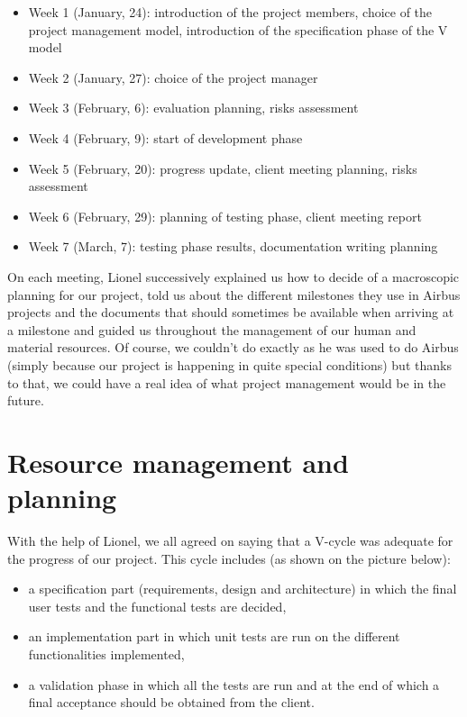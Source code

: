 \documentclass{report}
\begin{document}
\begin{itemize}


	\item Week 1 (January, 24): introduction of the project members, choice of the project management model, introduction of the specification phase of the V model
	\item Week 2 (January, 27): choice of the project manager
	\item Week 3 (February, 6): evaluation planning, risks assessment
	\item Week 4 (February, 9): start of development phase
	\item Week 5 (February, 20): progress update, client meeting planning, risks assessment
	\item Week 6 (February, 29): planning of testing phase, client meeting report
	\item Week 7 (March, 7): testing phase results, documentation writing planning

\end{itemize}

On each meeting, Lionel successively explained us how to decide of a macroscopic planning for our project, told us about the different milestones they use in Airbus projects and the documents that should sometimes be available when arriving at a milestone and guided us throughout the management of our human and material resources. Of course, we couldn't do exactly as he was used to do Airbus (simply because our project is happening in quite special conditions) but thanks to that, we could have a real idea of what project management would be in the future. 

\section{Resource management and planning}

With the help of Lionel, we all agreed on saying that a V-cycle was adequate for the progress of our project. This cycle includes (as shown on the picture below):

\begin{itemize}
	\item a specification part (requirements, design and architecture) in which the final user tests and the functional tests are decided,
	\item an implementation part in which unit tests are run on the different functionalities implemented,
	\item a validation phase in which all the tests are run and at the end of which a final acceptance should be obtained from the client.
\end{itemize}
\end{document}
